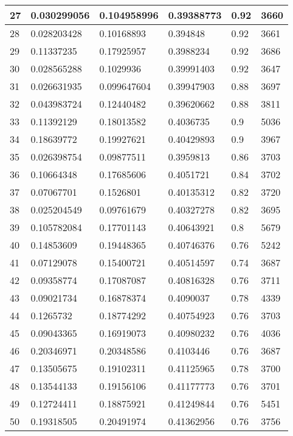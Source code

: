 \begin{longtable}{|l|l|l|l|l|l|}
27 & 0.030299056 & 0.104958996 & 0.39388773 & 0.92 & 3660 \\ \hline 
28 & 0.028203428 & 0.10168893 & 0.394848 & 0.92 & 3661 \\ \hline 
29 & 0.11337235 & 0.17925957 & 0.3988234 & 0.92 & 3686 \\ \hline 
30 & 0.028565288 & 0.1029936 & 0.39991403 & 0.92 & 3647 \\ \hline 
31 & 0.026631935 & 0.099647604 & 0.39947903 & 0.88 & 3697 \\ \hline 
32 & 0.043983724 & 0.12440482 & 0.39620662 & 0.88 & 3811 \\ \hline 
33 & 0.11392129 & 0.18013582 & 0.4036735 & 0.9 & 5036 \\ \hline 
34 & 0.18639772 & 0.19927621 & 0.40429893 & 0.9 & 3967 \\ \hline 
35 & 0.026398754 & 0.09877511 & 0.3959813 & 0.86 & 3703 \\ \hline 
36 & 0.10664348 & 0.17685606 & 0.4051721 & 0.84 & 3702 \\ \hline 
37 & 0.07067701 & 0.1526801 & 0.40135312 & 0.82 & 3720 \\ \hline 
38 & 0.025204549 & 0.09761679 & 0.40327278 & 0.82 & 3695 \\ \hline 
39 & 0.105782084 & 0.17701143 & 0.40643921 & 0.8 & 5679 \\ \hline 
40 & 0.14853609 & 0.19448365 & 0.40746376 & 0.76 & 5242 \\ \hline 
41 & 0.07129078 & 0.15400721 & 0.40514597 & 0.74 & 3687 \\ \hline 
42 & 0.09358774 & 0.17087087 & 0.40816328 & 0.76 & 3711 \\ \hline 
43 & 0.09021734 & 0.16878374 & 0.4090037 & 0.78 & 4339 \\ \hline 
44 & 0.1265732 & 0.18774292 & 0.40754923 & 0.76 & 3703 \\ \hline 
45 & 0.09043365 & 0.16919073 & 0.40980232 & 0.76 & 4036 \\ \hline 
46 & 0.20346971 & 0.20348586 & 0.4103446 & 0.76 & 3687 \\ \hline 
47 & 0.13505675 & 0.19102311 & 0.41125965 & 0.78 & 3700 \\ \hline 
48 & 0.13544133 & 0.19156106 & 0.41177773 & 0.76 & 3701 \\ \hline 
49 & 0.12724411 & 0.18875921 & 0.41249844 & 0.76 & 5451 \\ \hline 
50 & 0.19318505 & 0.20491974 & 0.41362956 & 0.76 & 3756 \\ \hline 
\end{longtable}